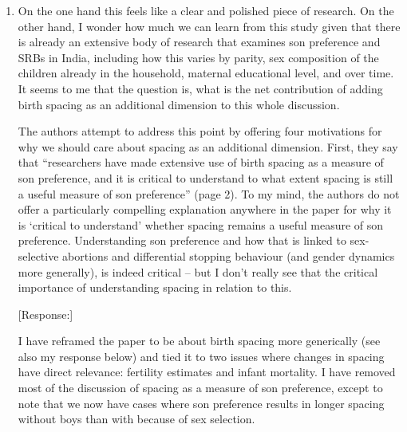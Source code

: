 \documentclass[letterpaper,12pt]{article}
\begin{document}
\begin{enumerate}

\item On the one hand this feels like a clear and polished piece of
research. On the other hand, I wonder how much we can learn from this
study given that there is already an extensive body of research that
examines son preference and SRBs in India, including how this varies by
parity, sex composition of the children already in the household,
maternal educational level, and over time. It seems to me that the
question is, what is the net contribution of adding birth spacing as an
additional dimension to this whole discussion.

The authors attempt to address this point by offering four motivations
for why we should care about spacing as an additional dimension. First,
they say that “researchers have made extensive use of birth spacing as a
measure of son preference, and it is critical to understand to what
extent spacing is still a useful measure of son preference” (page 2). To
my mind, the authors do not offer a particularly compelling explanation
anywhere in the paper for why it is ‘critical to understand’ whether
spacing remains a useful measure of son preference. Understanding son
preference and how that is linked to sex-selective abortions and
differential stopping behaviour (and gender dynamics more generally), is
indeed critical – but I don’t really see that the critical importance of
understanding spacing in relation to this.

[Response:]

I have reframed the paper to be about birth spacing more
generically (see also my response below) and tied it to two issues where
changes in spacing have direct relevance: fertility estimates and infant mortality.
I have removed most of the discussion of spacing as a measure of son preference,
except to note that we now have cases where son preference results in longer
spacing without boys than with because of sex selection.




\end{enumerate}
\end{document}
